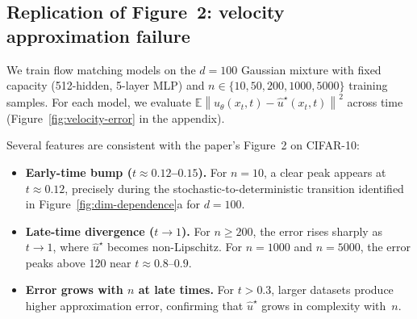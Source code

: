 \documentclass[10pt,a4paper]{article}
\theoremstyle{definition}
\newcommand{\E}{\mathbb{E}}
\newcommand{\norm}[1]{\left\lVert #1 \right\rVert}
\begin{document}
\subsection{Replication of Figure~2: velocity approximation failure}\label{subsec:fig2}

We train flow matching models on the $d = 100$ Gaussian mixture with fixed capacity (512-hidden, 5-layer MLP) and $n \in \{10, 50, 200, 1000, 5000\}$ training samples.
For each model, we evaluate $\E\norm{u_\theta(x_t,t) - \hat{u}^\star(x_t,t)}^2$ across time (Figure~\ref{fig:velocity-error} in the appendix).

Several features are consistent with the paper's Figure~2 on CIFAR-10:
\begin{itemize}[nosep,leftmargin=1.5em]
    \item \textbf{Early-time bump ($t \approx 0.12$--$0.15$).} For $n = 10$, a clear peak appears at $t \approx 0.12$, precisely during the stochastic-to-deterministic transition identified in Figure~\ref{fig:dim-dependence}a for $d = 100$.
    \item \textbf{Late-time divergence ($t \to 1$).} For $n \geq 200$, the error rises sharply as $t \to 1$, where $\hat{u}^\star$ becomes non-Lipschitz.
    For $n = 1000$ and $n = 5000$, the error peaks above 120 near $t \approx 0.8$--$0.9$.
    \item \textbf{Error grows with $n$ at late times.} For $t > 0.3$, larger datasets produce higher approximation error, confirming that $\hat{u}^\star$ grows in complexity with~$n$.
\end{itemize}
\end{document}
